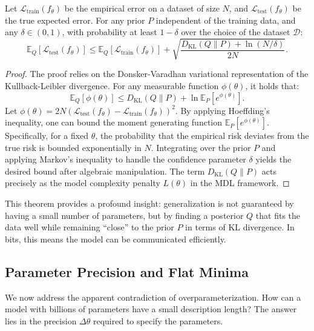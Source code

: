 \begin{theorem}
Let $\mathcal{L}_{\text{train}}(f_\theta)$ be the empirical error on a dataset of size $N$, and $\mathcal{L}_{\text{test}}(f_\theta)$ be the true expected error. For any prior $P$ independent of the training data, and any $\delta \in (0, 1)$, with probability at least $1 - \delta$ over the choice of the dataset $\mathcal{D}$:
\begin{equation}
    \mathbb{E}_{Q}[\mathcal{L}_{\text{test}}(f_\theta)] \le \mathbb{E}_{Q}[\mathcal{L}_{\text{train}}(f_\theta)] + \sqrt{\frac{D_{\text{KL}}(Q \parallel P) + \ln(N / \delta)}{2N}}.
\end{equation}
\end{theorem}
\begin{proof}
The proof relies on the Donsker-Varadhan variational representation of the Kullback-Leibler divergence. For any measurable function $\phi(\theta)$, it holds that:
\begin{equation}
    \mathbb{E}_Q[\phi(\theta)] \le D_{\text{KL}}(Q \parallel P) + \ln \mathbb{E}_P[e^{\phi(\theta)}].
\end{equation}
Let $\phi(\theta) = 2N (\mathcal{L}_{\text{test}}(f_\theta) - \mathcal{L}_{\text{train}}(f_\theta))^2$. By applying Hoeffding's inequality, one can bound the moment generating function $\mathbb{E}_P[e^{\phi(\theta)}]$. Specifically, for a fixed $\theta$, the probability that the empirical risk deviates from the true risk is bounded exponentially in $N$. Integrating over the prior $P$ and applying Markov's inequality to handle the confidence parameter $\delta$ yields the desired bound after algebraic manipulation. The term $D_{\text{KL}}(Q \parallel P)$ acts precisely as the model complexity penalty $L(\theta)$ in the MDL framework.
\end{proof}

This theorem provides a profound insight: generalization is not guaranteed by having a small number of parameters, but by finding a posterior $Q$ that fits the data well while remaining ``close'' to the prior $P$ in terms of KL divergence. In bits, this means the model can be communicated efficiently.

\subsection{Parameter Precision and Flat Minima}

We now address the apparent contradiction of overparameterization. How can a model with billions of parameters have a small description length? The answer lies in the precision $\Delta \theta$ required to specify the parameters. 

